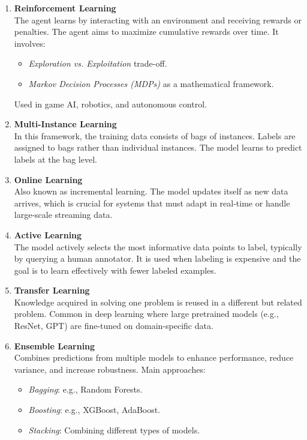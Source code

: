 \documentclass[a4paper,11pt]{article}
\begin{document}
\begin{enumerate}
    \item \textbf{Reinforcement Learning} \\
    The agent learns by interacting with an environment and receiving rewards or penalties. The agent aims to maximize cumulative rewards over time. It involves:
    \begin{itemize}
        \item \textit{Exploration vs. Exploitation} trade-off.
        \item \textit{Markov Decision Processes (MDPs)} as a mathematical framework.
    \end{itemize}
    Used in game AI, robotics, and autonomous control.

    \item \textbf{Multi-Instance Learning} \\
    In this framework, the training data consists of bags of instances. Labels are assigned to bags rather than individual instances. The model learns to predict labels at the bag level.

    \item \textbf{Online Learning} \\
    Also known as incremental learning. The model updates itself as new data arrives, which is crucial for systems that must adapt in real-time or handle large-scale streaming data.

    \item \textbf{Active Learning} \\
    The model actively selects the most informative data points to label, typically by querying a human annotator. It is used when labeling is expensive and the goal is to learn effectively with fewer labeled examples.

    \item \textbf{Transfer Learning} \\
    Knowledge acquired in solving one problem is reused in a different but related problem. Common in deep learning where large pretrained models (e.g., ResNet, GPT) are fine-tuned on domain-specific data.

    \item \textbf{Ensemble Learning} \\
    Combines predictions from multiple models to enhance performance, reduce variance, and increase robustness. Main approaches:
    \begin{itemize}
        \item \textit{Bagging}: e.g., Random Forests.
        \item \textit{Boosting}: e.g., XGBoost, AdaBoost.
        \item \textit{Stacking}: Combining different types of models.
    \end{itemize}


\end{enumerate}
\end{document}
